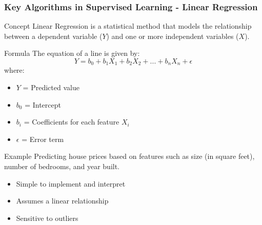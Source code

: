 \documentclass{beamer}
\begin{document}
\begin{frame}[fragile]
    \frametitle{Key Algorithms in Supervised Learning - Linear Regression}
    
    \begin{block}{Concept}
        Linear Regression is a statistical method that models the relationship between a dependent variable ($Y$) and one or more independent variables ($X$).
    \end{block}
    
    \begin{block}{Formula}
        The equation of a line is given by:
        \begin{equation}
            Y = b_0 + b_1X_1 + b_2X_2 + ... + b_nX_n + \epsilon
        \end{equation}
        where:
        \begin{itemize}
            \item $Y$ = Predicted value
            \item $b_0$ = Intercept
            \item $b_i$ = Coefficients for each feature $X_i$
            \item $\epsilon$ = Error term
        \end{itemize}
    \end{block}
    
    \begin{block}{Example}
        Predicting house prices based on features such as size (in square feet), number of bedrooms, and year built.
    \end{block}
    
    \begin{itemize}
        \item Simple to implement and interpret
        \item Assumes a linear relationship
        \item Sensitive to outliers
    \end{itemize}
\end{frame}
\end{document}
